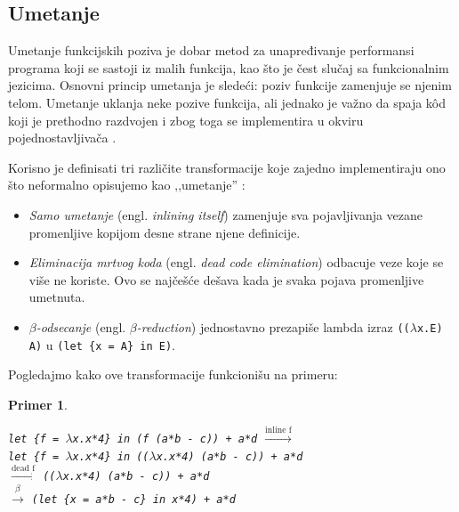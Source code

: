\documentclass[a4paper]{article}
\newtheorem{primer}{Primer}[section]
\begin{document}
\subsection{Umetanje}

Umetanje funkcijskih poziva je dobar metod za unapređivanje performansi programa koji se sastoji iz malih funkcija, kao što je čest slučaj sa funkcionalnim jezicima. Osnovni princip umetanja je sledeći: poziv funkcije zamenjuje se njenim telom. Umetanje uklanja neke pozive funkcija, ali jednako je važno da spaja k\^ od koji je prethodno razdvojen i zbog toga se implementira u okviru pojednostavljivača \cite{compilation-by-program-transformation}.

Korisno je definisati tri različite transformacije koje zajedno implementiraju ono što neformalno opisujemo kao ‚‚umetanje'' \cite{secrets-haskell-compiler-inliner, compilation-by-program-transformation}:
\begin{itemize}
	\item \textit{Samo umetanje} (engl. \textit{inlining itself}) zamenjuje sva pojavljivanja vezane promenljive kopijom desne strane njene definicije.
	
	
	\item \textit{Eliminacija mrtvog koda} (engl. \textit{dead code elimination}) odbacuje veze koje se više ne koriste. Ovo se najčešće dešava kada je svaka pojava promenljive umetnuta.
	
	\item \textit{$\beta$-odsecanje} (engl. \textit{$\beta$-reduction}) jednostavno prezapiše lambda izraz \verb|((|$\lambda$\verb|x.E) A)| u \verb|(let {x = A} in E)|. 
\end{itemize}

\noindent Pogledajmo kako ove transformacije funkcionišu na primeru:

\begin{primer} ~
	\begin{center}
		\verb|let {f = |$\lambda$\verb|x.x*4} in (f (a*b - c)) + a*d| 	$\stackrel{\text{inline f}}{\longrightarrow}$ \\
		\verb|let {f = |$\lambda$\verb|x.x*4} in ((|$\lambda$\verb|x.x*4) (a*b - c)) + a*d| \\
		$\stackrel{\text{dead f}}{\longrightarrow}$ \verb|((|$\lambda$\verb|x.x*4) (a*b - c)) + a*d|  \\
		$\stackrel{\beta}{\longrightarrow}$ \verb|(let {x = a*b - c} in x*4) + a*d|
	\end{center}
\end{primer}
\end{document}

